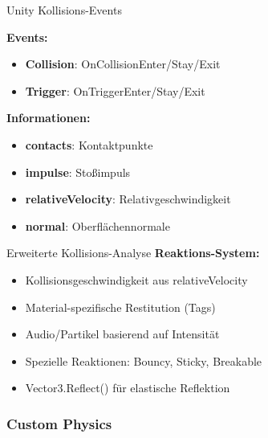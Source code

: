 
\begin{definition}{Unity Kollisions-Events}

    \textbf{Events:}
    \begin{itemize}
        \item \textbf{Collision}: OnCollisionEnter/Stay/Exit
        \item \textbf{Trigger}: OnTriggerEnter/Stay/Exit
    \end{itemize}
    
    \textbf{Informationen:}
    \begin{itemize}
        \item \textbf{contacts}: Kontaktpunkte
        \item \textbf{impulse}: Stoßimpuls
        \item \textbf{relativeVelocity}: Relativgeschwindigkeit
        \item \textbf{normal}: Oberflächennormale
    \end{itemize}
\end{definition}

\begin{concept}{Erweiterte Kollisions-Analyse}
    \textbf{Reaktions-System:}
    \begin{itemize}
        \item Kollisionsgeschwindigkeit aus relativeVelocity
        \item Material-spezifische Restitution (Tags)
        \item Audio/Partikel basierend auf Intensität
        \item Spezielle Reaktionen: Bouncy, Sticky, Breakable
        \item Vector3.Reflect() für elastische Reflektion
    \end{itemize}
\end{concept}

\multend

\subsubsection{Custom Physics}

